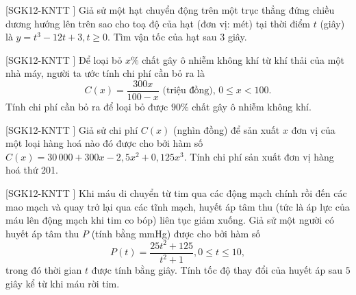 \begin{bt}%
 [SGK12-KNTT ]
	Giả sử một hạt chuyển động trên một trục thẳng đứng chiều dương hướng lên trên sao cho toạ độ của hạt (đơn vị: mét) tại thời điểm $t$ (giây) là $y=t^3-12t+3, t \geq 0$. Tìm vận tốc của hạt sau $3$ giây.
\end{bt}

\begin{bt}%
[SGK12-KNTT ]
	Để loại bỏ $x\%$ chất gây ô nhiễm không khí từ khí thải của một nhà máy, người ta ước tính chi phí cần bỏ ra là
	$$
	C(x)=\dfrac{300 x}{100-x} \text { (triệu đồng), } 0 \leq x < 100.
	$$		
	Tính chi phí cần bỏ ra để loại bỏ được $90 \%$ chất gây ô nhiễm không khí.
\end{bt}

\begin{bt}%
[SGK12-KNTT ]
	Giả sử chi phí $C(x)$ (nghìn đồng) để sản xuất $x$ đơn vị của một loại hàng hoá nào đó được cho bởi hàm số $C(x)=30\,000+300x-2{,}5x^2+0{,}125x^3$. Tính chi phí sản xuất đơn vị hàng hoá thứ 201.
\end{bt}

\begin{bt}%
[SGK12-KNTT ]
	Khi máu di chuyển từ tim qua các động mạch chính rồi đến các mao mạch và quay trở lại qua các tĩnh mạch, huyết áp tâm thu (tức là áp lực của máu lên động mạch khi tim co bóp) liên tục giảm xuống. Giả sử một người có huyết áp tâm thu $P$ (tính bằng mmHg) được cho bởi hàm số
	$$
	P(t)=\dfrac{25 t^2+125}{t^2+1}, 0 \leq t \leq 10,
	$$
	trong đó thời gian $t$ được tính bằng giây. Tính tốc độ thay đổi của huyết áp sau $5$ giây kể từ khi máu rời tim.
\end{bt}

